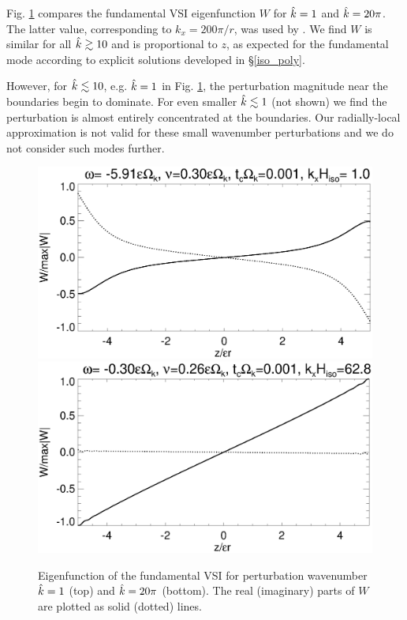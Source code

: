 Fig. \ref{lowfreq_eigenfunc} compares the fundamental VSI eigenfunction
$W$ for $\hat{k}=1$ and $\hat{k}=20\pi$. The latter value, corresponding
to $k_x= 200\pi/r$, was used by \cite{mcnally14}. We find $W$ is
similar for all $\hat{k}\gtrsim10$ and is proportional to $z$, as
expected for the fundamental mode according to explicit solutions
developed in \S\ref{iso_poly}.  

However, for $\hat{k}\lesssim 10$, e.g. $\hat{k}=1$ in 
Fig. \ref{lowfreq_eigenfunc}, the perturbation magnitude near the
boundaries begin to dominate. For even smaller $\hat{k}\lesssim 1$ (not
shown) we find the perturbation is almost entirely concentrated at the
boundaries. Our radially-local approximation is not valid for 
these small wavenumber perturbations and we do not consider such modes
further.      

\begin{figure}
  \includegraphics[width=\linewidth,clip=true,trim=0cm 1.75cm 0cm
  0cm]{figures/eigenvector_iso_kx1} 
  \includegraphics[width=\linewidth]{figures/eigenvector_iso_kx60}
  \caption{Eigenfunction of the fundamental VSI for perturbation
    wavenumber $\hat{k}=1$ (top) and $\hat{k}=20\pi$ (bottom). The real 
    (imaginary) parts of $W$ are plotted as solid (dotted) lines. 
    \label{lowfreq_eigenfunc}
  }
\end{figure}

